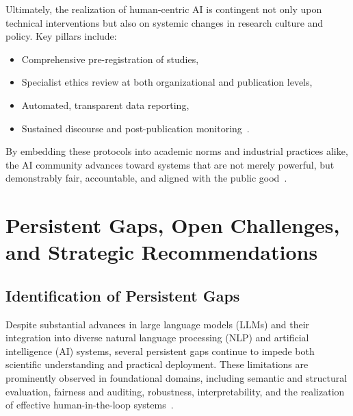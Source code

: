 Ultimately, the realization of human-centric AI is contingent not only upon technical interventions but also on systemic changes in research culture and policy. Key pillars include:
\begin{itemize}
    \item Comprehensive pre-registration of studies,
    \item Specialist ethics review at both organizational and publication levels,
    \item Automated, transparent data reporting,
    \item Sustained discourse and post-publication monitoring~\cite{ref40,ref52,ref53}.
\end{itemize}
By embedding these protocols into academic norms and industrial practices alike, the AI community advances toward systems that are not merely powerful, but demonstrably fair, accountable, and aligned with the public good~\cite{ref23,ref52,ref53,ref54,ref55}.

\section{Persistent Gaps, Open Challenges, and Strategic Recommendations}

\subsection{Identification of Persistent Gaps}

Despite substantial advances in large language models (LLMs) and their integration into diverse natural language processing (NLP) and artificial intelligence (AI) systems, several persistent gaps continue to impede both scientific understanding and practical deployment. These limitations are prominently observed in foundational domains, including semantic and structural evaluation, fairness and auditing, robustness, interpretability, and the realization of effective human-in-the-loop systems~\cite{ref2,ref7,ref10,ref12,ref13,ref15,ref16,ref17,ref18,ref19,ref20,ref22,ref24,ref25,ref26,ref28,ref30,ref31,ref32,ref33,ref34,ref36,ref37,ref38,ref39,ref42,ref43,ref44,ref46,ref47,ref48,ref49,ref50,ref52,ref53,ref54,ref55,ref56,ref57,ref58,ref59,ref60,ref66,ref67,ref68,ref69,ref70,ref76,ref77,ref78,ref79,ref80,ref86,ref87,ref88,ref89,ref90,ref91,ref92,ref93,ref94,ref95,ref96,ref97,ref98,ref99,ref100,ref101,ref102,ref103,ref104,ref105,ref106,ref107,ref108}.

